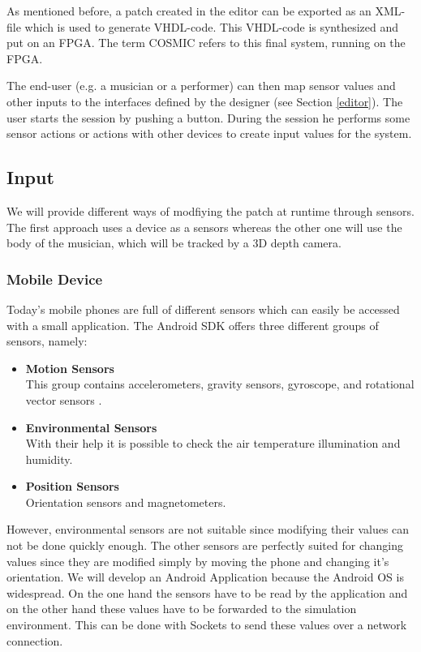 	As mentioned before, a patch created in the editor can be exported as an XML-file which is used to generate VHDL-code. This VHDL-code is synthesized and put on an \ac{FPGA}. 
	The term \ac{COSMIC} refers to this final system, running on the \ac{FPGA}.
	
	The end-user (e.g. a musician or a performer) can then map sensor values and other inputs to the interfaces defined by the designer (see Section \ref{editor}). The user starts the session by pushing a button. During the session he performs some sensor actions or actions with other devices to create input values for the system.
	
\subsection{Input}
We will provide different ways of modfiying the patch at runtime through sensors. The first approach uses a device as a sensors whereas the other one will use the body of the musician, which will be tracked by a 3D depth camera. 

\subsubsection{Mobile Device}
Today's mobile phones are full of different sensors which can easily be accessed with a small application. The Android SDK offers three different groups of sensors, namely:
\begin{itemize}
	\item \textbf{Motion Sensors} \\
			This group contains accelerometers, gravity sensors, gyroscope, and rotational vector sensors .
	\item \textbf{Environmental Sensors} \\
			With their help it is possible to check the air temperature illumination and humidity.
	\item \textbf{Position Sensors} \\
			Orientation sensors and magnetometers.
\end{itemize}

However, environmental sensors are not suitable since modifying their values can not be done quickly enough. The other sensors are perfectly suited for changing values since they are modified simply by moving the phone and changing it's orientation. We will develop an Android Application because the Android OS is widespread. On the one hand the sensors have to be read by the application and on the other hand these values have to be forwarded to the simulation environment. This can be done with Sockets to send these values over a network connection.

